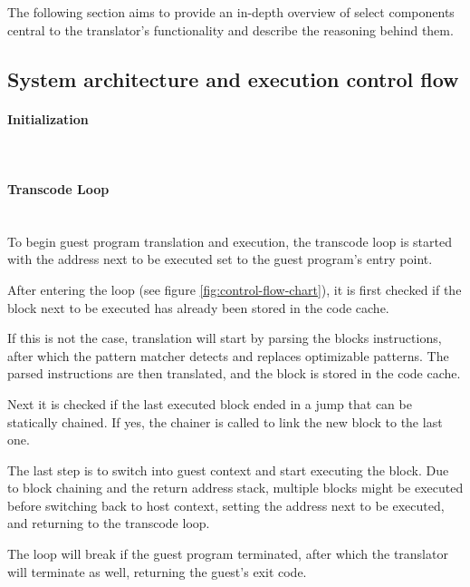 The following section aims to provide an in-depth overview of select components central to the translator's functionality and describe the reasoning behind them.

\subsection{System architecture and execution control flow}
\paragraph{Initialization}\mbox{}\\

\paragraph{Transcode Loop}\mbox{}\\
To begin guest program translation and execution, the transcode loop is started with the address next to be executed set to the guest program's entry point.

After entering the loop (see figure \ref{fig:control-flow-chart}), it is first checked if the block next to be executed has already been stored in the code cache. 

If this is not the case, translation will start by parsing the blocks instructions, after which the pattern matcher detects and replaces optimizable patterns. The parsed instructions are then translated, and the block is stored in the code cache.

Next it is checked if the last executed block ended in a jump that can be statically chained.
If yes, the chainer is called to link the new block to the last one.

The last step is to switch into guest context and start executing the block.
Due to block chaining and the return address stack, multiple blocks might be executed before switching back to host context, setting the address next to be executed, and returning to the transcode loop.

The loop will break if the guest program terminated, after which the translator will terminate as well, returning the guest's exit code.


